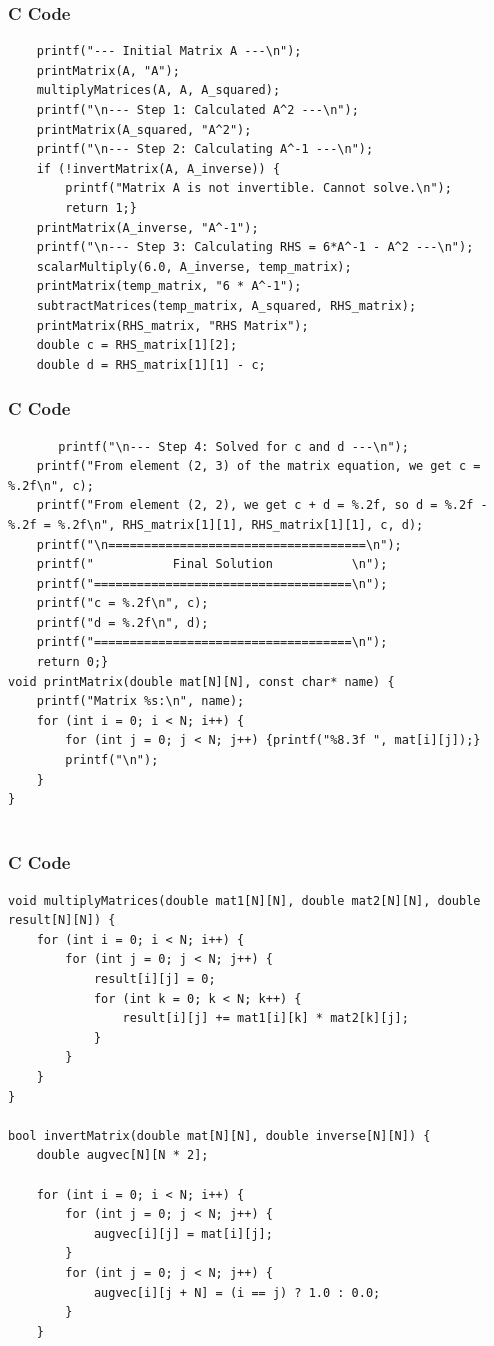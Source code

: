 \documentclass{beamer}
\begin{document}
\begin{frame}[fragile]
    \frametitle{C Code }
    \begin{lstlisting}
    printf("--- Initial Matrix A ---\n");
    printMatrix(A, "A");
    multiplyMatrices(A, A, A_squared);
    printf("\n--- Step 1: Calculated A^2 ---\n");
    printMatrix(A_squared, "A^2");
    printf("\n--- Step 2: Calculating A^-1 ---\n");
    if (!invertMatrix(A, A_inverse)) {
        printf("Matrix A is not invertible. Cannot solve.\n");
        return 1;}
    printMatrix(A_inverse, "A^-1");
    printf("\n--- Step 3: Calculating RHS = 6*A^-1 - A^2 ---\n");
    scalarMultiply(6.0, A_inverse, temp_matrix);
    printMatrix(temp_matrix, "6 * A^-1");
    subtractMatrices(temp_matrix, A_squared, RHS_matrix);
    printMatrix(RHS_matrix, "RHS Matrix");
    double c = RHS_matrix[1][2];
    double d = RHS_matrix[1][1] - c;
\end{lstlisting}
\end{frame}
\begin{frame}[fragile]
    \frametitle{C Code }
    \begin{lstlisting}
       printf("\n--- Step 4: Solved for c and d ---\n");
    printf("From element (2, 3) of the matrix equation, we get c = %.2f\n", c);
    printf("From element (2, 2), we get c + d = %.2f, so d = %.2f - %.2f = %.2f\n", RHS_matrix[1][1], RHS_matrix[1][1], c, d);
    printf("\n====================================\n");
    printf("           Final Solution           \n");
    printf("====================================\n");
    printf("c = %.2f\n", c);
    printf("d = %.2f\n", d);
    printf("====================================\n");
    return 0;}
void printMatrix(double mat[N][N], const char* name) {
    printf("Matrix %s:\n", name);
    for (int i = 0; i < N; i++) {
        for (int j = 0; j < N; j++) {printf("%8.3f ", mat[i][j]);}
        printf("\n");
    }
}
    
\end{lstlisting}
\end{frame}
\begin{frame}[fragile]
    \frametitle{C Code }
    \begin{lstlisting}
void multiplyMatrices(double mat1[N][N], double mat2[N][N], double result[N][N]) {
    for (int i = 0; i < N; i++) {
        for (int j = 0; j < N; j++) {
            result[i][j] = 0;
            for (int k = 0; k < N; k++) {
                result[i][j] += mat1[i][k] * mat2[k][j];
            }
        }
    }
}

bool invertMatrix(double mat[N][N], double inverse[N][N]) {
    double augvec[N][N * 2];

    for (int i = 0; i < N; i++) {
        for (int j = 0; j < N; j++) {
            augvec[i][j] = mat[i][j];
        }
        for (int j = 0; j < N; j++) {
            augvec[i][j + N] = (i == j) ? 1.0 : 0.0;
        }
    }
\end{lstlisting}
\end{frame}
\end{document}

